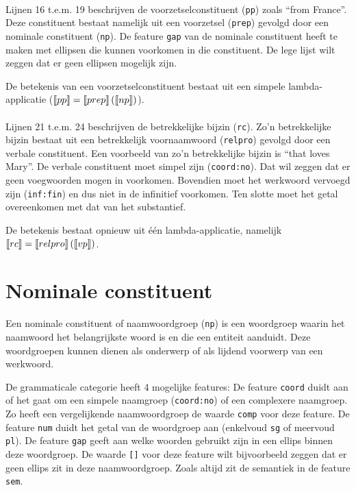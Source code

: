 \paragraph{} Lijnen 16 t.e.m. 19 beschrijven de voorzetselconstituent (\texttt{pp}) zoals ``from France''. Deze constituent bestaat namelijk uit een voorzetsel (\texttt{prep}) gevolgd door een nominale constituent (\texttt{np}). De feature \texttt{gap} van de nominale constituent heeft te maken met ellipsen die kunnen voorkomen in die constituent. De lege lijst wilt zeggen dat er geen ellipsen mogelijk zijn.

De betekenis van een voorzetselconstituent bestaat uit een simpele lambda-applicatie ($\llbracket pp\rrbracket = \llbracket prep\rrbracket \left( \llbracket np\rrbracket \right)$).

\paragraph{} Lijnen 21 t.e.m. 24 beschrijven de betrekkelijke bijzin (\texttt{rc}). Zo'n betrekkelijke bijzin bestaat uit een betrekkelijk voornaamwoord (\texttt{relpro}) gevolgd door een verbale constituent. Een voorbeeld van zo'n betrekkelijke bijzin is ``that loves Mary''. De verbale constituent moet simpel zijn (\texttt{coord:no}). Dat wil zeggen dat er geen voegwoorden mogen in voorkomen. Bovendien moet het werkwoord vervoegd zijn (\texttt{inf:fin}) en dus niet in de infinitief voorkomen. Ten slotte moet het getal overeenkomen met dat van het substantief.

De betekenis bestaat opnieuw uit één lambda-applicatie, namelijk $\llbracket rc\rrbracket = \llbracket relpro\rrbracket \left( \llbracket vp\rrbracket \right)$.

\section{Nominale constituent}
Een nominale constituent of naamwoordgroep (\texttt{np}) is een woordgroep waarin het naamwoord het belangrijkste woord is en die een entiteit aanduidt. Deze woordgroepen kunnen dienen als onderwerp of als lijdend voorwerp van een werkwoord.

De grammaticale categorie heeft 4 mogelijke features: De feature \texttt{coord} duidt aan of het gaat om een simpele naamgroep (\texttt{coord:no}) of een complexere naamgroep. Zo heeft een vergelijkende naamwoordgroep de waarde \texttt{comp} voor deze feature. De feature \texttt{num} duidt het getal van de woordgroep aan (enkelvoud \texttt{sg} of meervoud \texttt{pl}). De feature \texttt{gap} geeft aan welke woorden gebruikt zijn in een ellips binnen deze woordgroep. De waarde \texttt{[]} voor deze feature wilt bijvoorbeeld zeggen dat er geen ellips zit in deze naamwoordgroep. Zoals altijd zit de semantiek in de feature \texttt{sem}.

